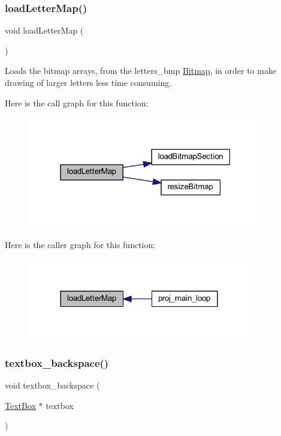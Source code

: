 \subsubsection{\texorpdfstring{load\+Letter\+Map()}{loadLetterMap()}}
{\footnotesize\ttfamily void load\+Letter\+Map (\begin{DoxyParamCaption}{ }\end{DoxyParamCaption})}



Loads the bitmap arrays, from the letters\+\_\+bmp \mbox{\hyperlink{struct_bitmap}{Bitmap}}, in order to make drawing of larger letters less time consuming. 

Here is the call graph for this function\+:\nopagebreak
\begin{figure}[H]
\begin{center}
\leavevmode
\includegraphics[width=292pt]{group__textbox_gac90ac8157e721b0af9b86534c5a93047_cgraph}
\end{center}
\end{figure}
Here is the caller graph for this function\+:\nopagebreak
\begin{figure}[H]
\begin{center}
\leavevmode
\includegraphics[width=276pt]{group__textbox_gac90ac8157e721b0af9b86534c5a93047_icgraph}
\end{center}
\end{figure}
\mbox{\label{group__textbox_gaa1d2e3ffe1e358b7d2956e2942859d4b}} 
\subsubsection{\texorpdfstring{textbox\+\_\+backspace()}{textbox\_backspace()}}
{\footnotesize\ttfamily void textbox\+\_\+backspace (\begin{DoxyParamCaption}\item[{\mbox{\hyperlink{struct_text_box}{Text\+Box}} $\ast$}]{textbox }\end{DoxyParamCaption})}



